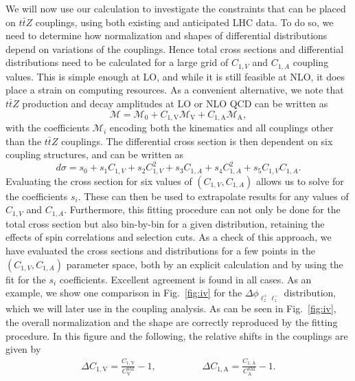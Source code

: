 \documentclass{JHEP3}
\newcommand{\mrm}{\mathrm}
\def\ttbZ{t\bar{t}Z}
\def\ConeA{C_{1,\mathrm{A}}}
\def\ConeV{C_{1,\mathrm{V}}}
\def\ConeVSM{C_\mathrm{V}^{\mrm{SM}}}
\def\ConeASM{C_\mathrm{A}^{\mrm{SM}}}
\def\DConeA{\Delta C_{1,\mathrm{A}}}
\def\DConeV{\Delta C_{1,\mathrm{V}}}
\newcommand{\be}{\begin{eqnarray}}
\newcommand{\ee}{\end{eqnarray}}
\begin{document}
We will now use our calculation to investigate the constraints that can be placed on $\ttbZ$ couplings, 
using both existing and anticipated LHC data. 
To do so, we need to determine how normalization and shapes of differential distributions depend on variations of the couplings. 
Hence total cross sections and differential distributions need to be calculated for a large grid of $C_{1,V}$ and $C_{1,A}$ coupling values. 
This is simple enough at LO, and while it is still feasible at NLO, it does place a strain on computing resources. 
As a convenient alternative, we note that $\ttbZ$ production and decay amplitudes at LO or NLO QCD can be written as
\begin{equation}
    \mathcal{M} = \mathcal{M}_0 +  \ConeV \mathcal{M}_\mathrm{V} +  \ConeA \mathcal{M}_\mathrm{A},
\end{equation}
with the coefficients $\mathcal{M}_i$ encoding both the kinematics and all couplings other than the $\ttbZ$ couplings. 
The differential cross section is then dependent on six coupling structures, and can be written as
\begin{equation}
    \label{couplfit}
    d\sigma = s_0 +s_1C_{1,V} + s_2C_{1,V}^2 +s_3 C_{1,A}+s_4C_{1,A}^2+s_5C_{1,V}C_{1,A}.
\end{equation}
Evaluating the cross section for six values of $(C_{1,V},C_{1,A})$ allows us to solve for the coefficients $s_i$. 
These can then be used to extrapolate results for any values of $C_{1,V}$ and $C_{1,A}$. 
Furthermore, this fitting procedure can not only be done for the total cross section but also bin-by-bin for a given distribution, 
retaining the effects of spin correlations and selection cuts.
As a check of this approach, we have evaluated the cross sections and distributions for a few points in the $(C_{1,V},C_{1,A})$ parameter space, 
both by an explicit calculation and by using the fit for the $s_i$ coefficients. Excellent agreement is found in all cases. 
As an example, we show one comparison in Fig.~\ref{fig:iv} for the  $\Delta \phi_{\ell^+_z \ell^-_z}$ distribution, which we will later use in the coupling analysis.
As can be seen in Fig.~\ref{fig:iv}, the overall normalization and the shape are correctly reproduced by the fitting procedure.
In this figure and the following, the relative shifts in the couplings are given by
\be
  \DConeV =  \frac{\ConeV}{\ConeVSM}-1,
  \hspace{2cm} 
  \DConeA = \frac{\ConeA}{\ConeASM}-1.
\ee
\end{document}
